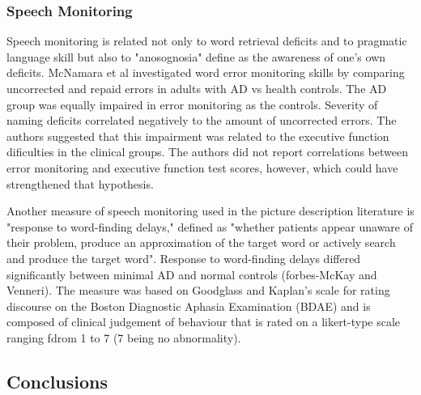 \documentclass{article}
\begin{document}
\subsubsection{Speech Monitoring}
Speech monitoring is related not only to word retrieval deficits and to pragmatic language skill but also to "anosognosia" define as the awareness of one's own deficits. McNamara et al investigated word error monitoring skills by comparing uncorrected and repaid errors in adults with AD vs health controls. The AD group was equally impaired in error monitoring as the controls. Severity of naming deficits correlated negatively to the amount of uncorrected errors. The authors suggested that this impairment was related to the executive function dificulties in the clinical groups. The authors did not report correlations between error monitoring and executive function test scores, however, which could have strengthened that hypothesis.
\par
Another measure of speech monitoring used in the picture description literature is "response to word-finding delays," defined as "whether patients appear unaware of their problem, produce an approximation of the target word or actively search and produce the target word". Response to word-finding delays differed significantly between minimal  AD and normal controls (forbes-McKay and Venneri). The measure was based on Goodglass and Kaplan's scale for rating discourse on the Boston Diagnostic Aphasia Examination (BDAE) and is composed of clinical judgement of behaviour that is rated on a likert-type scale ranging fdrom 1 to 7 (7 being no abnormality).
\par
\subsection{Conclusions}
\end{document}
